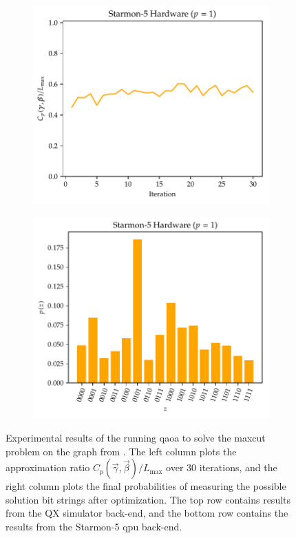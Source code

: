 \begin{figure}[ht]
    \begin{subfigure}{.49\textwidth}
        \centering
        \includegraphics[width=1\linewidth]{figures/qaoa_maxcut_n4_p1_starmon_optimization.pdf}
    \end{subfigure}
    \hfill
    \begin{subfigure}{.49\textwidth}
        \centering
        \includegraphics[width=1\linewidth]{figures/qaoa_maxcut_n4_p1_starmon_probs.pdf}
    \end{subfigure}

    \caption[Experimental results of the running the \gls{qaoa} to solve \gls{maxcut} problem on the graph from .]{
        Experimental results of the running \gls{qaoa} to solve the \gls{maxcut} problem on the graph from .
        The left column plots the approximation ratio $C_p(\vec{\gamma}, \vec{\beta})/L_\text{max}$ over 30 iterations, and the right column plots the final probabilities of measuring the possible solution bit strings after optimization.
        The top row contains results from the QX simulator back-end, and the bottom row contains the results from the Starmon-5 \gls{qpu} back-end.
    }
    \label{fig:qaoa-results}
\end{figure}